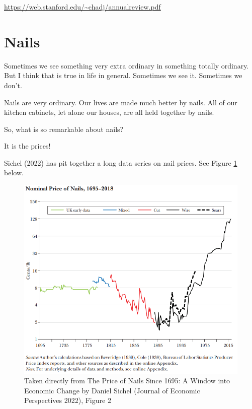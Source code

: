 \documentclass[
]{book}
\begin{document}
\url{https://web.stanford.edu/~chadj/annualreview.pdf}

\hypertarget{nails}{%
\section{Nails}\label{nails}}

Sometimes we see something very extra ordinary in something totally ordinary. But I think that is true in life in general. Sometimes we see it. Sometimes we don't.

Nails are very ordinary. Our lives are made much better by nails. All of our kitchen cabinets, let alone our houses, are all held together by nails.

So, what is so remarkable about nails?

It is the prices!

Sichel (2022) has pit together a long data series on nail prices. See Figure \ref{fig:sichelfig2} below.

\begin{figure}

{\centering \includegraphics[width=1\linewidth]{img/growth2/sichelfig2} 

}

\caption{Taken directly from The Price of Nails Since 1695: A Window into Economic Change by Daniel Sichel (Journal of Economic Perspectives 2022), Figure 2 }\label{fig:sichelfig2}
\end{figure}
\end{document}
